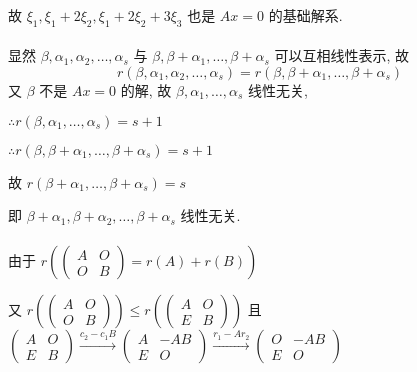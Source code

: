          故 \( \xi_{1}, \xi_{1}+2\xi_{2}, \xi_{1}+2\xi_{2}+3\xi_{3} \) 也是 \( Ax=0 \) 的基础解系.


     \paragraph{} %
         显然 \( \beta, \alpha_{1}, \alpha_{2}, \dots, \alpha_{s} \) 与 \( \beta, \beta+\alpha_{1}, \dots, \beta+\alpha_{s} \) 可以互相线性表示, 故
         \[ r(\beta, \alpha_{1}, \alpha_{2}, \dots, \alpha_{s}) = r(\beta, \beta+\alpha_{1}, \dots, \beta+\alpha_{s}) \]
         又 \( \beta \) 不是 \( Ax=0 \) 的解, 故 \( \beta, \alpha_{1}, \dots, \alpha_{s} \) 线性无关,

         \( \therefore r(\beta, \alpha_{1}, \dots, \alpha_{s}) = s+1 \)

         \( \therefore r(\beta, \beta+\alpha_{1}, \dots, \beta+\alpha_{s}) = s+1 \)

         故 \( r(\beta+\alpha_{1}, \dots, \beta+\alpha_{s}) = s \)

         即 \( \beta+\alpha_{1}, \beta+\alpha_{2}, \dots, \beta+\alpha_{s} \) 线性无关.


     \paragraph{} %
         由于 \( r(\begin{pmatrix}
             A & O \\
             O & B
         \end{pmatrix} = r(A)+r(B)) \)

         又 \( r(\begin{pmatrix}
             A & O \\
             O & B
         \end{pmatrix}) \leq r(\begin{pmatrix}
             A & O \\
             E & B
         \end{pmatrix}) \) 且 \( \begin{pmatrix}
             A & O \\
             E & B
         \end{pmatrix} \xrightarrow{c_2-c_1B} \begin{pmatrix}
             A & -AB \\
             E & O
         \end{pmatrix} \xrightarrow{r_{1}-Ar_{2}} \begin{pmatrix}
             O & -AB \\
             E & O
         \end{pmatrix} \)

